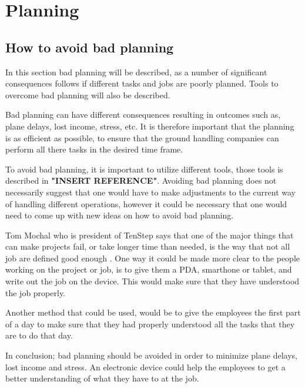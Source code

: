 \chapter{Planning}
\section{How to avoid bad planning}
In this section bad planning will be described, as a number of significant consequences follows if different tasks and jobs are poorly planned. Tools to overcome bad planning will also be described.

Bad planning can have different consequences resulting in outcomes such as, plane delays, lost income, stress, etc. It is therefore important that the planning is as efficient as possible, to ensure that the ground handling companies can perform all there tasks in the desired time frame.

To avoid bad planning, it is important to utilize different tools, those  tools is described in \textbf{"INSERT REFERENCE"}. Avoiding bad planning does not necessarily suggest that one would have to make adjustments to the current way of handling different operations, however it could be necessary that one would need to come up with new ideas on how to avoid bad planning.

Tom Mochal who is president of TenStep \cite{AvoidP_TenStep} says that one of the major things that can make projects fail, or take longer time than needed, is the way that not all job are defined good enough \cite{AvoidP_PoorP}. One way it could be made more clear to the people working on the project or job, is to give them a PDA, smarthone or tablet, and write out the job on the device. This would make sure that they have understood the job properly.


Another method that could be used, would be to give the employees the first part of a day to make sure that they had properly understood all the tasks that they are to do that day.

In conclusion; bad planning should be avoided in order to minimize plane delays, lost income and stress. An electronic device could help the employees to get a better understanding of what they have to at the job. 